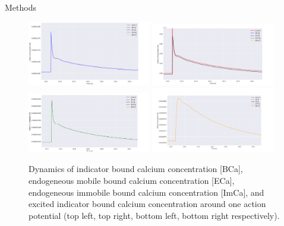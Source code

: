 \documentclass[final]{beamer}
\newlength{\onecolwid}
\begin{document}
\begin{frame}[t]
\begin{columns}[t]
\begin{column}{\onecolwid}
\begin{block}{Methods}
%

\begin{figure}
	\centering
	\includegraphics[width=0.48\textwidth]{concentration_dynamics_18_zoomed_BCa.png}
	\includegraphics[width=0.48\textwidth]{concentration_dynamics_18_zoomed_ECa.png} \\
	\includegraphics[width=0.48\textwidth]{concentration_dynamics_18_zoomed_ImCa.png}
	\includegraphics[width=0.48\textwidth]{concentration_dynamics_18_zoomed_excited.png}
	\caption{Dynamics of indicator bound calcium concentration [BCa], endogeneous mobile bound calcium concentration [ECa], endogeneous immobile bound calcium concentration [ImCa], and excited indicator bound calcium concentration around one action potential (top left, top right, bottom left, bottom right respectively).}
\end{figure}


\end{block}
\end{column}
\end{columns}
\end{frame}
\end{document}
